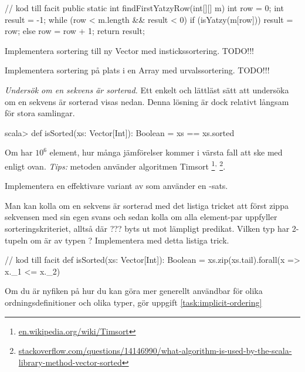 \begin{Code}[language=Java]
// kod till facit
    public static int findFirstYatzyRow(int[][] m){
        int row = 0;
        int result = -1;
        while (row < m.length && result < 0){
            if (isYatzy(m[row])) {
              result = row;
            } else {
              row = row + 1;    
            }
        }
        return result;
    }
\end{Code}



\Task Implementera sortering till ny Vector med instickssortering. TODO!!!


\Task Implementera sortering på plats i en Array med urvalssortering. TODO!!!



\ExtraTasks %

\Task \label{task:isSorted} \emph{Undersök om en sekvens är sorterad.} Ett enkelt och lättläst sätt att undersöka om en sekvens är sorterad visas nedan. Denna lösning är dock relativt långsam för stora samlingar.
\begin{REPL}
scala> def isSorted(xs: Vector[Int]): Boolean = xs == xs.sorted
\end{REPL}
\Subtask\Pen  Om  har $10^6$ element, hur många jämförelser kommer i värsta fall att ske med  enligt ovan. \emph{Tips:} metoden  använder algoritmen Timsort%
\footnote{\href{https://en.wikipedia.org/wiki/Timsort}{en.wikipedia.org/wiki/Timsort}}\textsuperscript{, }\footnote{\href{http://stackoverflow.com/questions/14146990/what-algorithm-is-used-by-the-scala-library-method-vector-sorted}{stackoverflow.com/questions/14146990/what-algorithm-is-used-by-the-scala-library-method-vector-sorted}}.



\Subtask Implementera en effektivare variant av  som använder en -sats.

\Subtask \label{subtask:isSorted-zip} Man kan kolla om en sekvens är sorterad med det listiga tricket att först zippa sekvensen med sin egen svans och sedan kolla om alla element-par uppfyller sorteringskriteriet, alltså  där ??? byts ut mot lämpligt predikat. Vilken typ har 2-tupeln  om  är av typen ? Implementera  med detta listiga trick.
\begin{Code}
// kod till facit
def isSorted(xs: Vector[Int]): Boolean = 
  xs.zip(xs.tail).forall(x => x._1 <= x._2) 
\end{Code}
Om du är nyfiken på hur du kan göra  mer generellt användbar för olika ordningsdefinitioner och olika typer, gör uppgift \ref{task:implicit-ordering}



